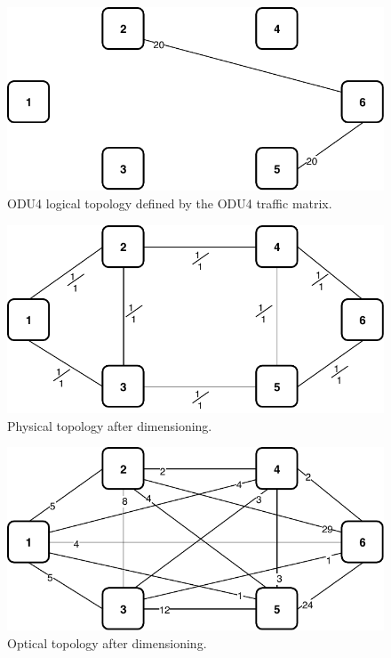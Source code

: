 \begin{figure}[h!]
\centering
\includegraphics[width=12cm]{sdf/ilp/transparent_protection/figures/logical_topology_ODU4_high}
\caption{ODU4 logical topology defined by the ODU4 traffic matrix.}
\label{logical2_ODU4_protectionhigh}
\end{figure}

\newpage
\begin{figure}[h!]
\centering
\includegraphics[width=12cm]{sdf/ilp/transparent_protection/figures/physical_topology}
\caption{Physical topology after dimensioning.}
\label{physical2_protectionhigh}
\end{figure}

\vspace{17pt}
\begin{figure}[h!]
\centering
\includegraphics[width=12cm]{sdf/ilp/transparent_protection/figures/optical_topology_high}
\caption{Optical topology after dimensioning.}
\label{optical2_protectionhigh}
\end{figure}


